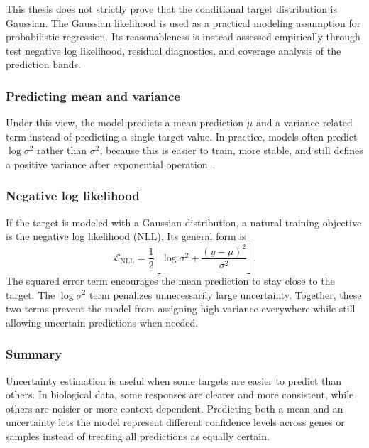 \noindent This thesis does not strictly prove that the conditional target distribution is Gaussian. The Gaussian likelihood is used as a practical modeling assumption for probabilistic regression. Its reasonableness is instead assessed empirically through test negative log likelihood, residual diagnostics, and coverage analysis of the prediction bands.

\subsubsection{Predicting mean and variance}
\noindent Under this view, the model predicts a mean prediction $\mu$ and a variance related term instead of predicting a single target value. In practice, models often predict $\log \sigma^{2}$ rather than $\sigma^{2}$, because this is easier to train, more stable, and still defines a positive variance after exponential operation~\cite{kendall2017uncertainties}.

\subsubsection{Negative log likelihood}
\noindent If the target is modeled with a Gaussian distribution, a natural training objective is the negative log likelihood (NLL). Its general form is
\begin{equation}
\label{eq:gaussian_nll}
\mathcal{L}_{\mathrm{NLL}}=\frac{1}{2}\left[\log \sigma^{2}+\frac{(y-\mu)^{2}}{\sigma^{2}}\right].
\end{equation}
The squared error term encourages the mean prediction to stay close to the target. The $\log \sigma^{2}$ term penalizes unnecessarily large uncertainty. Together, these two terms prevent the model from assigning high variance everywhere while still allowing uncertain predictions when needed.

\subsubsection{Summary}
\noindent Uncertainty estimation is useful when some targets are easier to predict than others. In biological data, some responses are clearer and more consistent, while others are noisier or more context dependent. Predicting both a mean and an uncertainty lets the model represent different confidence levels across genes or samples instead of treating all predictions as equally certain.

